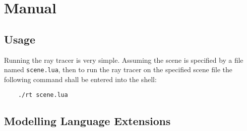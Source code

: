 \chapter{Manual}

\section{Usage}
Running the ray tracer is very simple. Assuming the scene is specified by a file
named \verb|scene.lua|,
then to run the ray tracer
on the specified scene file the following command shall be entered into the
shell:
\begin{verbatim}
    ./rt scene.lua
\end{verbatim}

\section{Modelling Language Extensions}
